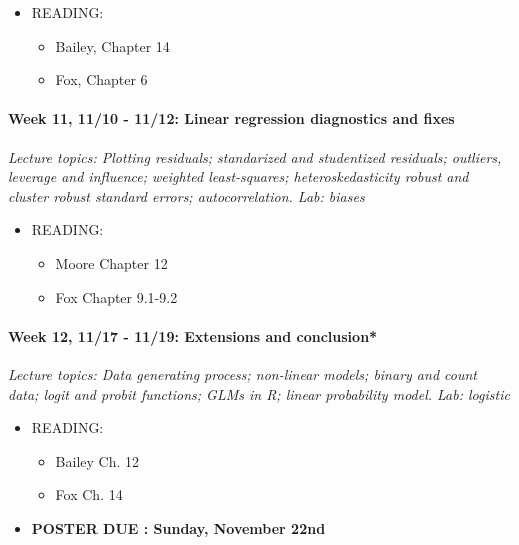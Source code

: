 \documentclass[11pt]{article}
\providecommand{\tightlist}{%
  \setlength{\itemsep}{0pt}\setlength{\parskip}{0pt}}
\begin{document}
\begin{itemize}
\tightlist
\item
  READING:
  \begin{itemize}
  \tightlist
  \item
    Bailey, Chapter 14
  \item
    Fox, Chapter 6
  \end{itemize}
\end{itemize}

\paragraph{Week 11, 11/10 - 11/12: Linear regression diagnostics and fixes\\}
\emph{Lecture topics: Plotting residuals; standarized and studentized residuals; outliers, leverage and influence; weighted least-squares; heteroskedasticity robust and cluster robust standard errors; autocorrelation. Lab: biases}\\

\begin{itemize}
\tightlist
\item
  READING:
  \begin{itemize}
  \tightlist
  \item
    Moore Chapter 12
  \item
    Fox Chapter 9.1-9.2
  \end{itemize}
\end{itemize}

\paragraph{Week 12, 11/17 - 11/19: Extensions and conclusion*\\}
\emph{Lecture topics: Data generating process; non-linear models; binary and count data; logit and probit functions; GLMs in R; linear probability model. Lab: logistic}\\

\begin{itemize}
\tightlist
\item
  READING:
  \begin{itemize}
  \tightlist
  \item
    Bailey Ch. 12
  \item
    Fox Ch. 14
  \end{itemize}
    \item 
  \textbf{POSTER DUE : Sunday, November 22nd}
\end{itemize}
\end{document}
